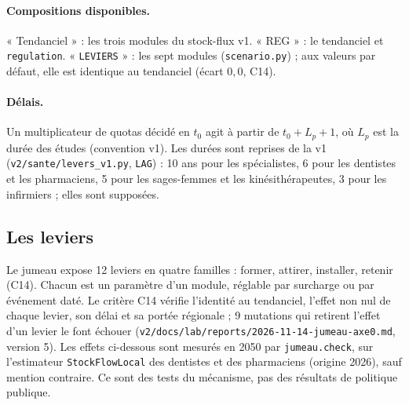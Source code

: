 \paragraph{Compositions disponibles.} « Tendanciel » : les trois modules du stock-flux v1. « REG » : le
tendanciel et \texttt{regulation}. « \texttt{LEVIERS} » : les sept modules (\texttt{scenario.py}) ; aux valeurs
par défaut, elle est identique au tendanciel (écart $0{,}0$\mesure{}, C14).

\paragraph{Délais.} Un multiplicateur de quotas décidé en $t_0$ agit à partir de $t_0 + L_p + 1$, où $L_p$ est la
durée des études (convention v1). Les durées sont reprises de la v1 (\texttt{v2/sante/levers\_v1.py},
\texttt{LAG}) : 10 ans pour les spécialistes, 6 pour les dentistes et les pharmaciens, 5 pour les sages-femmes et
les kinésithérapeutes, 3 pour les infirmiers ; elles sont supposées\suppose{}.

\subsection{Les leviers}\label{jum:leviers}

Le jumeau expose 12\mesure{} leviers en quatre familles : former, attirer, installer, retenir (C14). Chacun est
un paramètre d'un module, réglable par surcharge ou par événement daté. Le critère C14 vérifie l'identité au
tendanciel, l'effet non nul de chaque levier, son délai et sa portée régionale ; 9 mutations qui retirent l'effet
d'un levier le font échouer (\texttt{v2/docs/lab/reports/2026-11-14-jumeau-axe0.md}, version 5). Les effets
ci-dessous sont mesurés en 2050 par \texttt{jumeau.check}, sur l'estimateur \texttt{StockFlowLocal} des
dentistes et des pharmaciens (origine 2026), sauf mention contraire. Ce sont des tests du mécanisme, pas des
résultats de politique publique.

